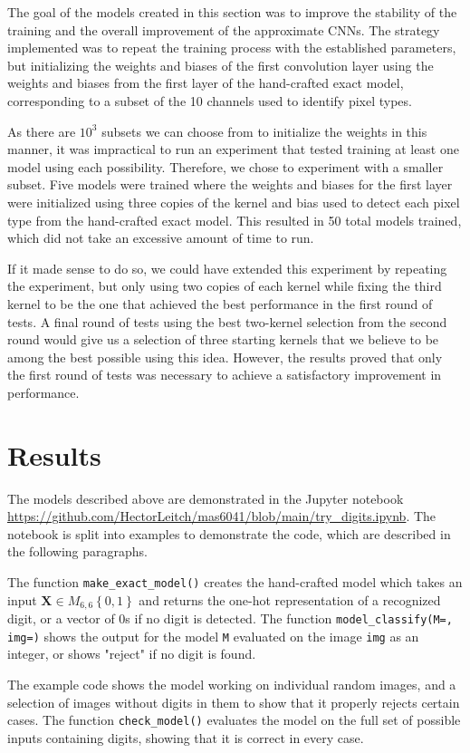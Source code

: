 \documentclass{somasmsc}
\begin{document}
The goal of the models created in this section was to improve the stability of the training and the overall improvement of the approximate CNNs. The strategy implemented was to repeat the training process with the established parameters, but initializing the weights and biases of the first convolution layer using the weights and biases from the first layer of the hand-crafted exact model, corresponding to a subset of the 10 channels used to identify pixel types.

As there are $10^3$ subsets we can choose from to initialize the weights in this manner, it was impractical to run an experiment that tested training at least one model using each possibility. Therefore, we chose to experiment with a smaller subset. Five models were trained where the weights and biases for the first layer were initialized using three copies of the kernel and bias used to detect each pixel type from the hand-crafted exact model. This resulted in 50 total models trained, which did not take an excessive amount of time to run.

If it made sense to do so, we could have extended this experiment by repeating the experiment, but only using two copies of each kernel while fixing the third kernel to be the one that achieved the best performance in the first round of tests. A final round of tests using the best two-kernel selection from the second round would give us a selection of three starting kernels that we believe to be among the best possible using this idea. However, the results proved that only the first round of tests was necessary to achieve a satisfactory improvement in performance.

\section{Results}

The models described above are demonstrated in the Jupyter notebook \url{https://github.com/HectorLeitch/mas6041/blob/main/try_digits.ipynb}. The notebook is split into examples to demonstrate the code, which are described in the following paragraphs.

\begin{exa}
The function \verb|make_exact_model()| creates the hand-crafted model which takes an input $\mathbf{X} \in M_{6,6}\left\{0,1\right\}$ and returns the one-hot representation of a recognized digit, or a vector of 0s if no digit is detected. The function \verb|model_classify(M=, img=)| shows the output for the model \verb|M| evaluated on the image \verb|img| as an integer, or shows "reject" if no digit is found.

The example code shows the model working on individual random images, and a selection of images without digits in them to show that it properly rejects certain cases. The function \verb|check_model()| evaluates the model on the full set of possible inputs containing digits, showing that it is correct in every case.
\end{exa}
\end{document}
